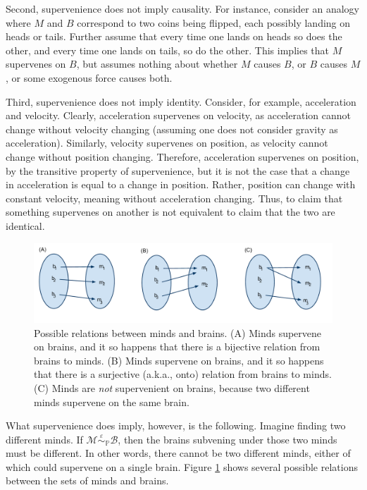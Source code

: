 \documentclass{article}
\newcommand{\mB}{\mathcal{B}}
\newcommand{\mM}{\mathcal{M}}
\newcommand{\PP}{\mathbb{P}}           %
\newcommand{\MeB}{\mM \overset{\varepsilon}{{\sim}}_{\PP} \mB}
\begin{document}
Second,  supervenience does not imply causality. %
For instance, consider an analogy where $M$ and $B$ correspond to two coins being flipped, each possibly landing on heads or tails.  Further assume that every time one lands on heads so does the other, and every time one lands on tails, so do the other. This implies that $M$ supervenes on $B$, but assumes nothing about whether $M$ causes $B$, or $B$ causes $M$, or some exogenous force causes both.  

Third, supervenience does not imply identity.  Consider, for example, acceleration and velocity.  Clearly, acceleration supervenes on velocity, as acceleration cannot change without velocity changing (assuming one does not consider gravity as acceleration).  Similarly, velocity supervenes on position, as velocity cannot change without position changing.  Therefore, acceleration supervenes on position, by the transitive property of supervenience, but it is not the case that a change in acceleration is equal to a change in position.  Rather, position can change with constant velocity, meaning without acceleration changing.  Thus, to claim that something supervenes on another is not equivalent to claim that the two are identical.

\begin{figure}[htbp]
	\centering
		\includegraphics[width=1\linewidth]{supervenience_relations.pdf}
	\caption{Possible relations between minds and brains.  (A) Minds supervene on brains, and it so happens that there is a bijective relation from brains to minds.  (B) Minds supervene on brains, and it so happens that there is a surjective (a.k.a., onto) relation from brains to minds. (C) Minds are \emph{not} supervenient on brains, because two different minds supervene on the same brain.}
	\label{fig:rel}
\end{figure}

What supervenience does imply, however, is the following.   Imagine finding two different minds.  If $\MeB$, then the brains subvening under those two minds must be different.  In other words, there cannot be two different minds, either of which could supervene on a single brain.  Figure \ref{fig:rel} shows several possible relations between the sets of minds and brains.
\end{document}
